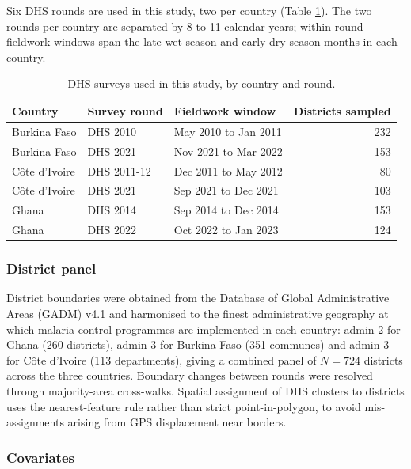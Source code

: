 \documentclass{article}
\begin{document}
Six DHS rounds are used in this study, two per country (Table
\ref{tab:surveys}). The two rounds per country are separated by 8 to 11
calendar years; within-round fieldwork windows span the late wet-season
and early dry-season months in each country.

\begingroup\fontsize{8}{10}\selectfont

\begin{longtable}[t]{lllr}
\caption{\label{tab:surveys}DHS surveys used in this study, by country and round. \label{tab:surveys}}\\
\toprule
Country & Survey round & Fieldwork window & Districts sampled\\
\midrule
Burkina Faso & DHS 2010 & May 2010 to Jan 2011 & 232\\
Burkina Faso & DHS 2021 & Nov 2021 to Mar 2022 & 153\\
Côte d'Ivoire & DHS 2011-12 & Dec 2011 to May 2012 & 80\\
Côte d'Ivoire & DHS 2021 & Sep 2021 to Dec 2021 & 103\\
Ghana & DHS 2014 & Sep 2014 to Dec 2014 & 153\\
\addlinespace
Ghana & DHS 2022 & Oct 2022 to Jan 2023 & 124\\
\bottomrule
\end{longtable}
\endgroup{}

\subsubsection{District panel}\label{district-panel}

\label{sec:panel}

District boundaries were obtained from the Database of Global
Administrative Areas (GADM) v4.1 and harmonised to the finest
administrative geography at which malaria control programmes are
implemented in each country: admin-2 for Ghana (260 districts), admin-3
for Burkina Faso (351 communes) and admin-3 for Côte d'Ivoire (113
departments), giving a combined panel of \(N = 724\) districts across
the three countries. Boundary changes between rounds were resolved
through majority-area cross-walks. Spatial assignment of DHS clusters to
districts uses the nearest-feature rule rather than strict
point-in-polygon, to avoid mis-assignments arising from GPS displacement
near borders.

\subsubsection{Covariates}\label{covariates}
\end{document}
